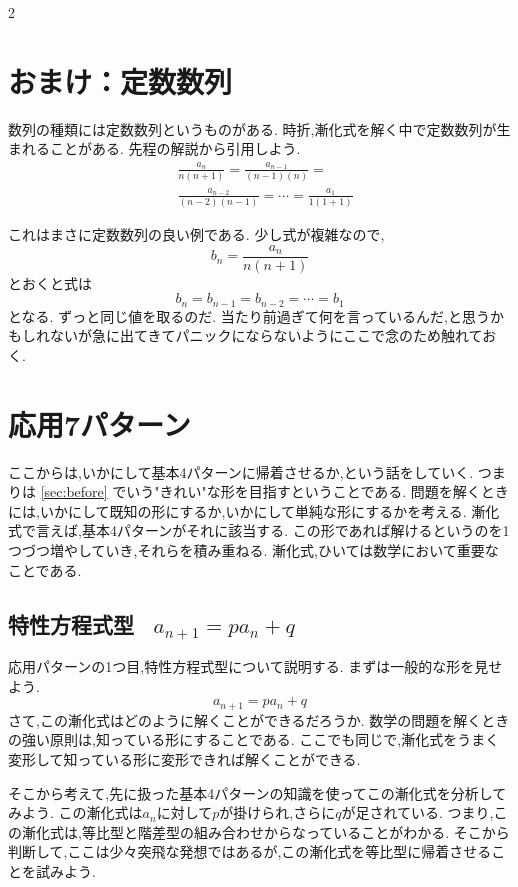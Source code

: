 \documentclass[dvipdfmx,a4paper,11pt,fleqn,openany]{jsbook}
\begin{document}
\begin{multicols*}{2}
  \section{おまけ：定数数列}
    数列の種類には定数数列というものがある.
    時折,漸化式を解く中で定数数列が生まれることがある.
    先程の解説から引用しよう.
    \begin{align*}
      &\frac{a_{n}}{n(n+1)}=\frac{a_{n-1}}{(n-1)(n)}=\\
      &\frac{a_{n-2}}{(n-2)(n-1)}=\cdots=\frac{a_{1}}{1(1+1)}
    \end{align*}

    これはまさに定数数列の良い例である.
    少し式が複雑なので,
    \[
      b_n=\frac{a_{n}}{n(n+1)}
    \]
    とおくと式は
    \[
      b_n=b_{n-1}=b_{n-2}=\cdots=b_1
    \]
    となる.
    ずっと同じ値を取るのだ.
    当たり前過ぎて何を言っているんだ,と思うかもしれないが急に出てきてパニックにならないようにここで念のため触れておく.

\section{応用7パターン}
  ここからは,いかにして基本4パターンに帰着させるか,という話をしていく.
  つまりは \ref{sec:before} でいう"きれい"な形を目指すということである.
  問題を解くときには,いかにして既知の形にするか,いかにして単純な形にするかを考える.
  漸化式で言えば,基本4パターンがそれに該当する.
  この形であれば解けるというのを1つづつ増やしていき,それらを積み重ねる.
  漸化式,ひいては数学において重要なことである.
  
  \subsection{特性方程式型 \, $a_{n+1}=pa_n+q$}
    応用パターンの1つ目,特性方程式型について説明する.
    まずは一般的な形を見せよう.
    \[
      a_{n+1}=pa_n+q
    \]
    さて,この漸化式はどのように解くことができるだろうか.
    数学の問題を解くときの強い原則は,知っている形にすることである.
    ここでも同じで,漸化式をうまく変形して知っている形に変形できれば解くことができる.
    
    そこから考えて,先に扱った基本4パターンの知識を使ってこの漸化式を分析してみよう.
    この漸化式は$a_n$に対して$p$が掛けられ,さらに$q$が足されている.
    つまり,この漸化式は,等比型と階差型の組み合わせからなっていることがわかる.
    そこから判断して,ここは少々突飛な発想ではあるが,この漸化式を等比型に帰着させることを試みよう.
    

\end{multicols*}
\end{document}
